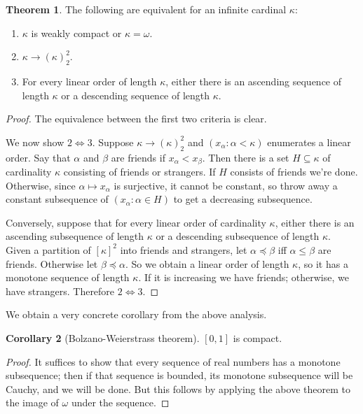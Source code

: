 \documentclass[12pt]{report}
\theoremstyle{definition}
\newtheorem{theorem}{Theorem}[chapter]
\newtheorem{corollary}[theorem]{Corollary}
\begin{document}
\begin{theorem}
The following are equivalent for an infinite cardinal $\kappa$:
\begin{enumerate}
\item $\kappa$ is weakly compact or $\kappa = \omega$.
\item $\kappa \to (\kappa)^2_2$.
\item For every linear order of length $\kappa$, either there is an ascending sequence of length $\kappa$ or a descending sequence of length $\kappa$.
\end{enumerate}
\end{theorem}
\begin{proof}
The equivalence between the first two criteria is clear.

We now show $2 \Leftrightarrow 3$. Suppose $\kappa \to (\kappa)^2_2$ and $(x_\alpha: \alpha < \kappa)$ enumerates a linear order. Say that $\alpha$ and $\beta$ are friends if $x_\alpha < x_\beta$.
Then there is a set $H \subseteq \kappa $ of cardinality $\kappa$ consisting of friends or strangers. If $H$ consists of friends we're done.
Otherwise, since $\alpha \mapsto x_\alpha$ is surjective, it cannot be constant, so throw away a constant subsequence of $(x_\alpha: \alpha \in H)$ to get a decreasing subsequence.

Conversely, suppose that for every linear order of cardinality $\kappa$, either there is an ascending subsequence of length $\kappa$ or a descending subsequence of length $\kappa$.
Given a partition of $[\kappa]^2$ into friends and strangers, let $\alpha \preceq \beta$ iff $\alpha\leq\beta$ are friends. Otherwise let $\beta \preceq \alpha$.
So we obtain a linear order of length $\kappa$, so it has a monotone sequence of length $\kappa$. If it is increasing we have friends; otherwise, we have strangers.
Therefore $2 \Leftrightarrow 3$.
\end{proof}

We obtain a very concrete corollary from the above analysis.
\begin{corollary}[Bolzano-Weierstrass theorem]
$[0, 1]$ is compact.
\end{corollary}
\begin{proof}
It suffices to show that every sequence of real numbers has a monotone subsequence; then if that sequence is bounded, its monotone subsequence will be Cauchy, and we will be done. But this follows by applying the above theorem to the image of $\omega$ under the sequence.
\end{proof}
\end{document}
